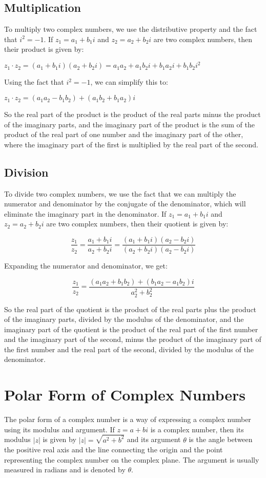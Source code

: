 \documentclass{article}
\begin{document}
\subsection{Multiplication}
To multiply two complex numbers, we use the distributive property and the fact
that $i^2 = -1$. If $z_1 = a_1 + b_1i$ and $z_2 = a_2 + b_2i$ are two complex
numbers, then their product is given by:

$z_1 \cdot z_2 = (a_1 + b_1i)(a_2 + b_2i) = a_1a_2 + a_1b_2i + b_1a_2i + b_1b_2i^2$

Using the fact that $i^2 = -1$, we can simplify this to:

$z_1 \cdot z_2 = (a_1a_2 - b_1b_2) + (a_1b_2 + b_1a_2)i$

So the real part of the product is the product of the real parts minus the
product of the imaginary parts, and the imaginary part of the product is the
sum of the product of the real part of one number and the imaginary part of the
other, where the imaginary part of the first is multiplied by the real part of
the second.


\subsection{Division}
To divide two complex numbers, we use the fact that we can multiply the
numerator and denominator by the conjugate of the denominator, which will
eliminate the imaginary part in the denominator. If $z_1 = a_1 + b_1i$ and $z_2
= a_2 + b_2i$ are two complex numbers, then their quotient is given by:

\[
\dfrac{z_1}{z_2} = \dfrac{a_1 + b_1i}{a_2 + b_2i} = \dfrac{(a_1 + b_1i)(a_2 - b_2i)}{(a_2 + b_2i)(a_2 - b_2i)}
\]

Expanding the numerator and denominator, we get:

\[
\dfrac{z_1}{z_2} = \dfrac{(a_1a_2 + b_1b_2) + (b_1a_2 - a_1b_2)i}{a_2^2 + b_2^2}
\]

So the real part of the quotient is the product of the real parts plus the
product of the imaginary parts, divided by the modulus of the denominator, and
the imaginary part of the quotient is the product of the real part of the first
number and the imaginary part of the second, minus the product of the imaginary
part of the first number and the real part of the second, divided by the
modulus of the denominator.



\section{Polar Form of Complex Numbers}
The polar form of a complex number is a way of expressing a complex number
using its modulus and argument. If $z = a + bi$ is a complex number, then its
modulus $|z|$ is given by $|z| = \sqrt{a^2 + b^2}$ and its argument $\theta$ is
the angle between the positive real axis and the line connecting the origin and
the point representing the complex number on the complex plane. The argument is
usually measured in radians and is denoted by $\theta$. 
\end{document}
